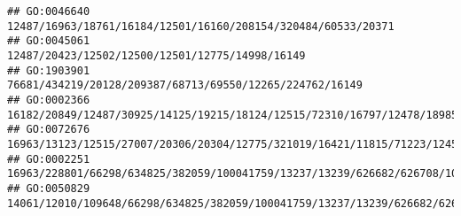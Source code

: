 \documentclass[
]{article}
\begin{document}
\begin{verbatim}
## GO:0046640                                                                                                                                                                                                                                                                                                                                                12487/16963/18761/16184/12501/16160/208154/320484/60533/20371
## GO:0045061                                                                                                                                                                                                                                                                                                                                                              12487/20423/12502/12500/12501/12775/14998/16149
## GO:1903901                                                                                                                                                                                                                                                                                                                                                     76681/434219/20128/209387/68713/69550/12265/224762/16149
## GO:0002366                                                                                                                                                                                                                                           16182/20849/12487/30925/14125/19215/18124/12515/72310/16797/12478/18985/16160/20556/12775/16364/17079/13421/321019/12458/57757/15000/14999/16149/14126/20371/12229
## GO:0072676                                                                                                                                                                                                                                                                                                                         16963/13123/12515/27007/20306/20304/12775/321019/16421/11815/71223/12458/11629/12766
## GO:0002251                                                                                                                                                                                                                                                                                                                  16963/228801/66298/634825/382059/100041759/13237/13239/626682/626708/100041952/503491/11808
## GO:0050829                                                                                                                                                                                                                                                                                                14061/12010/109648/66298/634825/382059/100041759/13237/13239/626682/626708/100041952/503491/81897/16160/78416

\end{verbatim}
\end{document}
